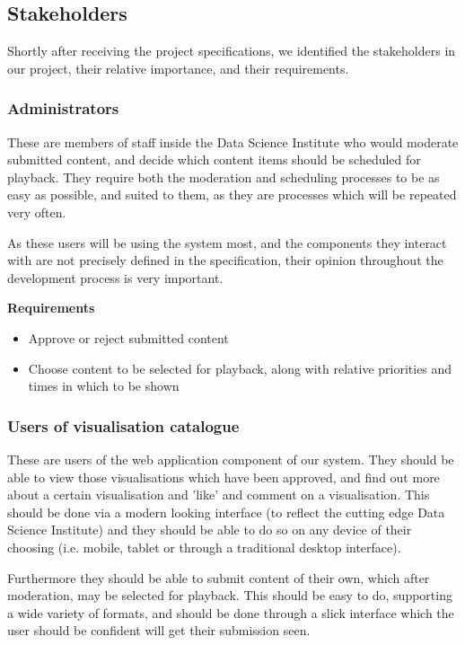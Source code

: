\documentclass[a4paper, titlepage]{article}
\begin{document}
\subsection{Stakeholders}

Shortly after receiving the project specifications, we identified the stakeholders in our project, their relative importance, and their requirements.

\subsubsection{Administrators}
These are members of staff inside the Data Science Institute who would moderate submitted content, and decide which content items should be scheduled for playback. They require both the moderation and scheduling processes to be as easy as possible, and suited to them, as they are processes which will be repeated very often.

As these users will be using the system most, and the components they interact with are not precisely defined in the specification, their opinion throughout the development process is very important.

\textbf{Requirements}
\begin{itemize}
\item Approve or reject submitted content
\item Choose content to be selected for playback, along with relative priorities and times in which to be shown
\end{itemize}

\subsubsection{Users of visualisation catalogue}

These are users of the web application component of our system. They should be able to view those visualisations which have been approved, and find out more about a certain visualisation and 'like' and comment on a visualisation. This should be done via a modern looking interface (to reflect the cutting edge Data Science Institute) and they should be able to do so on any device of their choosing (i.e. mobile, tablet or through a traditional desktop interface).

Furthermore they should be able to submit content of their own, which after moderation, may be selected for playback. This should be easy to do, supporting a wide variety of formats, and should be done through a slick interface which the user should be confident will get their submission seen.
\end{document}
